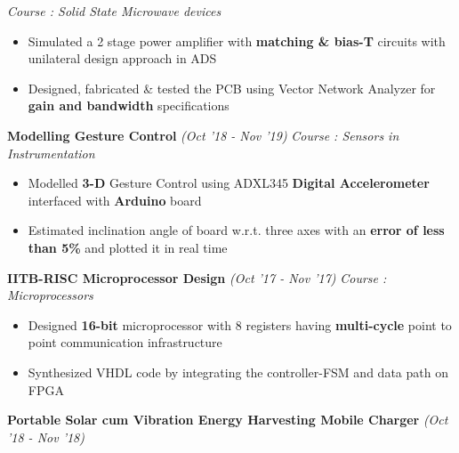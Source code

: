 \documentclass[10 pt]{article}%
\begin{document}
{{{{{{	\vspace{-0.8em}
	{\flushleft \em{Course : Solid State Microwave devices}}
	\vspace{-5pt}
	\begin{itemize}[leftmargin=*]
		\setlength\itemsep{1pt}
		\setlength\parskip{1pt}
		\item Simulated a 2 stage power amplifier with \textbf{matching \& bias-T} circuits with unilateral design approach in ADS  
		\item Designed, fabricated \& tested the PCB using Vector Network Analyzer for \textbf{gain and bandwidth} specifications
	\end{itemize}
{\flushleft \textbf {\large{Modelling Gesture Control}} \hfill {{{\em{(Oct '18 - Nov '19)}}}}
	\vspace{-0.8em}
	{\flushleft \em{Course : Sensors in Instrumentation}}
	\vspace{-5pt}
	\begin{itemize}[leftmargin=*]
		\setlength\itemsep{1pt}
		\setlength\parskip{1pt}
		\item Modelled \textbf{3-D }Gesture Control using ADXL345 \textbf{Digital Accelerometer} interfaced with \textbf{Arduino} board
		\item Estimated inclination angle of board w.r.t. three axes with an \textbf{error of less than 5\% }and plotted it in real time
	\end{itemize}
{\flushleft \textbf {\large{IITB-RISC Microprocessor Design}} \hfill {{{\em{(Oct '17 - Nov '17)}}}}
	\vspace{-0.8em}
	{\flushleft \em{Course : Microprocessors}}
	\vspace{-5pt}
	\begin{itemize}[leftmargin=*]
		\setlength\itemsep{1pt}
\setlength\parskip{1pt}
		\item Designed \textbf{16-bit} microprocessor with 8 registers having \textbf{multi-cycle} point to point communication infrastructure
		\item Synthesized VHDL code by integrating the controller-FSM and data path on FPGA
	\end{itemize}
{\flushleft \textbf {\large{Portable Solar cum Vibration Energy Harvesting Mobile Charger}} \hfill {{{\em{(Oct '18 - Nov '18)}}}}
}}}}}}}}}
\end{document}
